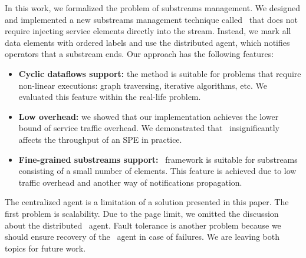 In this work, we formalized the problem of substreams management. We designed and implemented a new substreams management technique called \tracker\ that does not require injecting service elements directly into the stream. Instead, we mark all data elements with ordered labels and use the distributed agent, which notifies operators that a substream ends. Our approach has the following features:

\begin{itemize}
     \item {\bf Cyclic dataflows support:} the method is suitable for problems that require non-linear executions: graph traversing, iterative algorithms, etc. We evaluated this feature within the real-life problem.
     \item {\bf Low overhead:} we showed that our implementation achieves the lower bound of service traffic overhead. We demonstrated that \tracker\ insignificantly affects the throughput of an SPE in practice.
     \item {\bf Fine-grained substreams support:} \tracker\ framework is suitable for substreams consisting of a small number of elements. This feature is achieved due to low traffic overhead and another way of notifications propagation.
\end{itemize}

The centralized agent is a limitation of a solution presented in this paper. The first problem is scalability. Due to the page limit, we omitted the discussion about the distributed \tracker\ agent. Fault tolerance is another problem because we should ensure recovery of the \tracker\ agent in case of failures. We are leaving both topics for future work.




